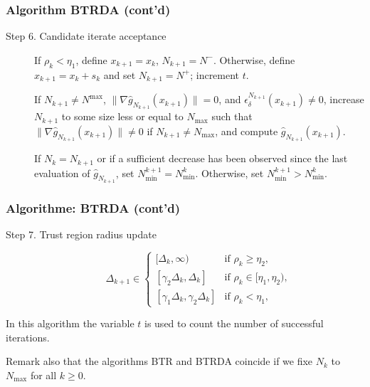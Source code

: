 \documentclass{beamer}
\begin{document}
\begin{frame}
\frametitle{Algorithm BTRDA (cont'd)}

\begin{description}
\item[Step 6. Candidate iterate acceptance]
If $\rho_k < \eta_1$, define $x_{k+1} = x_k$, $N_{k+1} = N^-$.
Otherwise, define $x_{k+1} = x_k + s_k$ and set $N_{k+1} = N^+$;
increment $t$.

\mbox{}

If $N_{k+1} \ne N^{\max}$, $\| \nabla \hat{g}_{N_{k+1}}(x_{k+1})\| = 0$, and
$\epsilon_{\delta}^{N_{k+1}}(x_{k+1}) \ne 0$, increase $N_{k+1}$ to some size less or equal to $N_{\max}$ such that $\| \nabla \hat{g}_{N_{k+1}}(x_{k+1})\| \ne 0$ if $N_{k+1} \ne N_{\max}$, and compute $\hat{g}_{N_{k+1}}(x_{k+1})$.

\mbox{}

If $N_k = N_{k+1}$ or if a sufficient decrease has been observed since the last evaluation of $\hat{g}_{N_{k+1}}$, set $N_{\min}^{k+1} = N_{\min}^k$.
Otherwise, set $N_{\min}^{k+1} > N^k_{\min}$.
\end{description}

\end{frame}

\begin{frame}
\frametitle{Algorithme: BTRDA (cont'd)}

\begin{description}
\item[Step 7. Trust region radius update]
\[
\Delta_{k+1} \in \begin{cases}
[\Delta_k, \infty) & \mbox{if } \rho_k \geq \eta_2, \\
[\gamma_2 \Delta_k, \Delta_k] & \mbox{if } \rho_k \in [\eta_1, \eta_2),\\
[\gamma_1 \Delta_k, \gamma_2 \Delta_k] & \mbox{if } \rho_k < \eta_1,
\end{cases}
\]
\end{description}

\mbox{}

In this algorithm the variable $t$ is used to count the number of successful iterations.

\mbox{}

Remark also that the algorithms BTR and BTRDA coincide if we fixe $N_k$ to $N_{\max}$ for all $k \geq 0$.

\end{frame}
\end{document}
